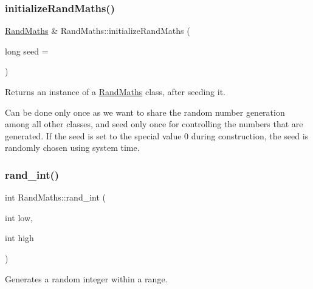 \subsubsection{\texorpdfstring{initialize\+Rand\+Maths()}{initializeRandMaths()}}
{\footnotesize\ttfamily \mbox{\hyperlink{classrcombinator_1_1RandMaths}{Rand\+Maths}} \& Rand\+Maths\+::initialize\+Rand\+Maths (\begin{DoxyParamCaption}\item[{long}]{seed = {} }\end{DoxyParamCaption})\hspace{0.3cm}{\ttfamily [static]}}



Returns an instance of a \mbox{\hyperlink{classrcombinator_1_1RandMaths}{Rand\+Maths}} class, after seeding it. 

Can be done only once as we want to share the random number generation among all other classes, and seed only once for controlling the numbers that are generated. If the seed is set to the special value 0 during construction, the seed is randomly chosen using system time. \mbox{\label{classrcombinator_1_1RandMaths_ae417da209eb8a9d1b2217e7a5397926c}} 
\subsubsection{\texorpdfstring{rand\+\_\+int()}{rand\_int()}}
{\footnotesize\ttfamily int Rand\+Maths\+::rand\+\_\+int (\begin{DoxyParamCaption}\item[{int}]{low,  }\item[{int}]{high }\end{DoxyParamCaption})}



Generates a random integer within a range. 

